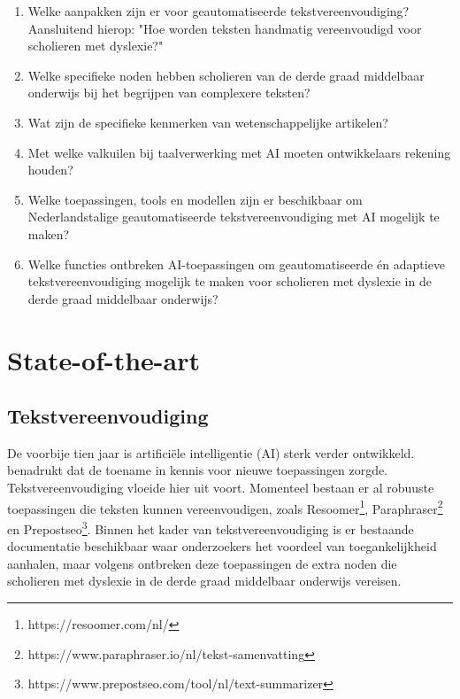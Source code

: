   

\begin{enumerate}
	\item Welke aanpakken zijn er voor geautomatiseerde tekstvereenvoudiging? Aansluitend hierop: "Hoe worden teksten handmatig vereenvoudigd voor scholieren met dyslexie?"
	\item Welke specifieke noden hebben scholieren van de derde graad middelbaar onderwijs bij het begrijpen van complexere teksten?
	\item Wat zijn de specifieke kenmerken van wetenschappelijke artikelen? 
	\item Met welke valkuilen bij taalverwerking met AI moeten ontwikkelaars rekening houden?
	\item Welke toepassingen, tools en modellen zijn er beschikbaar om Nederlandstalige geautomatiseerde tekstvereenvoudiging met AI mogelijk te maken?
	\item Welke functies ontbreken AI-toepassingen om geautomatiseerde én adaptieve tekstvereenvoudiging mogelijk te maken voor \newline scholieren met dyslexie in de derde graad \newline middelbaar onderwijs? 
\end{enumerate}


\section{State-of-the-art}%
\label{sec:state-of-the-art}

\subsection{Tekstvereenvoudiging}

De voorbije tien jaar is artificiële intelligentie (AI) sterk verder ontwikkeld. \textcite{Vasista2022} benadrukt dat de toename in kennis voor nieuwe toepassingen zorgde. Tekstvereenvoudiging vloeide hier uit voort. Momenteel bestaan er al robuuste toepassingen die teksten kunnen vereenvoudigen, zoals Resoomer\footnote{https://resoomer.com/nl/}, Paraphraser\footnote{https://www.paraphraser.io/nl/tekst-samenvatting} en Prepostseo\footnote{https://www.prepostseo.com/tool/nl/text-summarizer}. Binnen het kader van tekstvereenvoudiging is er bestaande documentatie beschikbaar waar onderzoekers het voordeel van toegankelijkheid aanhalen, maar volgens \textcite{Gooding2022} ontbreken deze toepassingen de extra noden die scholieren met dyslexie in de derde graad middelbaar onderwijs vereisen.

